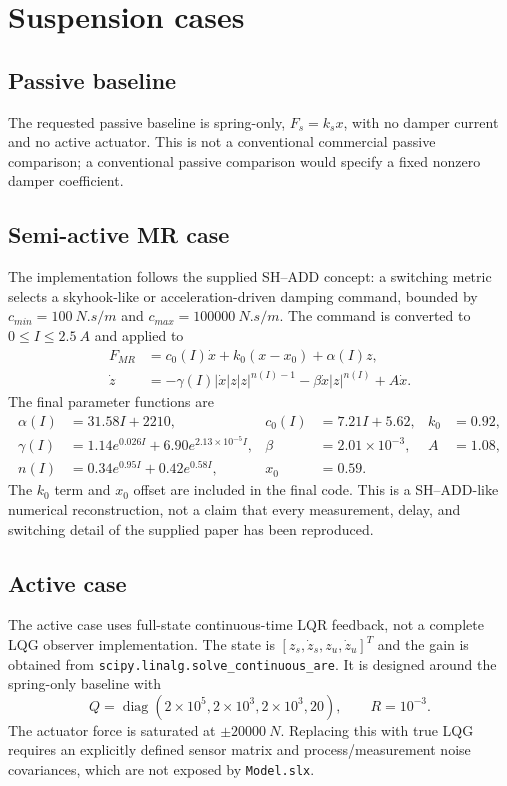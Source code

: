 \documentclass[11pt,a4paper]{article}
\begin{document}
\section{Suspension cases}
\subsection{Passive baseline}
The requested passive baseline is spring-only, $F_s=k_sx$, with no damper current and no active actuator. This is not a conventional commercial passive comparison; a conventional passive comparison would specify a fixed nonzero damper coefficient.

\subsection{Semi-active MR case}
The implementation follows the supplied SH--ADD concept: a switching metric selects a skyhook-like or acceleration-driven damping command, bounded by $c_{min}=\SI{100}{N.s/m}$ and $c_{max}=\SI{100000}{N.s/m}$. The command is converted to $0\le I\le\SI{2.5}{A}$ and applied to
\begin{align}
 F_{MR} &= c_0(I)\dot x+k_0(x-x_0)+\alpha(I)z,\\
 \dot z &= -\gamma(I)|\dot x|z|z|^{n(I)-1}-\beta\dot x|z|^{n(I)}+A\dot x.
\end{align}
The final parameter functions are
\begin{align*}
\alpha(I)&=31.58I+2210, & c_0(I)&=7.21I+5.62, & k_0&=0.92,\\
\gamma(I)&=1.14e^{0.026I}+6.90e^{2.13\times10^{-5}I}, & \beta&=2.01\times10^{-3}, & A&=1.08,\\
n(I)&=0.34e^{0.95I}+0.42e^{0.58I}, & x_0&=0.59.
\end{align*}
The $k_0$ term and $x_0$ offset are included in the final code. This is a SH--ADD-like numerical reconstruction, not a claim that every measurement, delay, and switching detail of the supplied paper has been reproduced.

\subsection{Active case}
The active case uses full-state continuous-time LQR feedback, not a complete LQG observer implementation. The state is $[z_s,\dot z_s,z_u,\dot z_u]^T$ and the gain is obtained from \texttt{scipy.linalg.solve\_continuous\_are}. It is designed around the spring-only baseline with
\begin{equation}
 Q=\operatorname{diag}(2\times10^5,2\times10^3,2\times10^3,20),\qquad R=10^{-3}.
\end{equation}
The actuator force is saturated at $\pm\SI{20000}{N}$. Replacing this with true LQG requires an explicitly defined sensor matrix and process/measurement noise covariances, which are not exposed by \texttt{Model.slx}.
\end{document}
